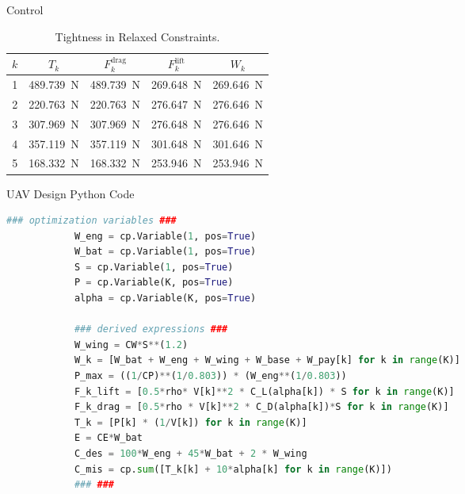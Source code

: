 \begin{chapter}{Control}
    \begin{table}[htbp]
        \centering
        \begin{center}
        \begin{tabular}{ccccc}
            \toprule
            $k$ & $T_k$ & $F_k^\text{drag}$ & $F_k^\text{lift}$ & $W_k$ \\
            \midrule
            1 & \SI{489.739}{\newton} & \SI{489.739}{\newton} & \SI{269.648}{\newton} & \SI{269.646}{\newton} \\
            2 & \SI{220.763}{\newton} & \SI{220.763}{\newton} & \SI{276.647}{\newton} & \SI{276.646}{\newton} \\
            3 & \SI{307.969}{\newton} & \SI{307.969}{\newton} & \SI{276.648}{\newton} & \SI{276.646}{\newton} \\
            4 & \SI{357.119}{\newton} & \SI{357.119}{\newton} & \SI{301.648}{\newton} & \SI{301.646}{\newton} \\
            5 & \SI{168.332}{\newton} & \SI{168.332}{\newton} & \SI{253.946}{\newton} & \SI{253.946}{\newton} \\
            \bottomrule
        \end{tabular}
        \end{center}
        \caption{Tightness in Relaxed Constraints.}
        \label{tab:uav_tight_comparison}
    \end{table}


    \begin{algorithm}[H]
        \caption{UAV Design Python Code}
        \centering
            \begin{lstlisting}[language=Python]
            ### optimization variables ###
            W_eng = cp.Variable(1, pos=True)
            W_bat = cp.Variable(1, pos=True)
            S = cp.Variable(1, pos=True)
            P = cp.Variable(K, pos=True)
            alpha = cp.Variable(K, pos=True)
            
            ### derived expressions ###
            W_wing = CW*S**(1.2)
            W_k = [W_bat + W_eng + W_wing + W_base + W_pay[k] for k in range(K)]
            P_max = ((1/CP)**(1/0.803)) * (W_eng**(1/0.803))
            F_k_lift = [0.5*rho* V[k]**2 * C_L(alpha[k]) * S for k in range(K)]
            F_k_drag = [0.5*rho * V[k]**2 * C_D(alpha[k])*S for k in range(K)]
            T_k = [P[k] * (1/V[k]) for k in range(K)]
            E = CE*W_bat
            C_des = 100*W_eng + 45*W_bat + 2 * W_wing
            C_mis = cp.sum([T_k[k] + 10*alpha[k] for k in range(K)])
            ### ###
            

\end{lstlisting}
\end{algorithm}
\end{chapter}
